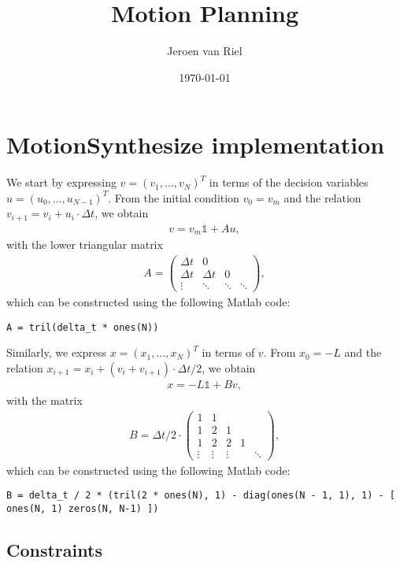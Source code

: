 \documentclass{article}
\author{Jeroen van Riel}
\date{\monthyeardate\today}
\title{Motion Planning}
\theoremstyle{definition}
\theoremstyle{plain}
\begin{document}
\section*{MotionSynthesize implementation}

We start by expressing $v = {(v_{1}, \dots, v_{N})}^{T}$ in terms of the decision variables $u = {(u_{0}, \dots, u_{N-1})}^{T}$.
From the initial condition $v_{0} = v_{m}$ and the relation $v_{i+1} = v_{i} + u_{i} \cdot \Delta t$, we obtain
\begin{align*}
  v = v_{m} \mathds{1} + Au ,
\end{align*}
with the lower triangular matrix
\begin{align*}
  A =
  \begin{pmatrix}
    \Delta t & 0  \\
    \Delta t & \Delta t & 0 &  \\
    \vdots & \ddots & \ddots & \ddots
    \end{pmatrix} ,
\end{align*}
which can be constructed using the following Matlab code:
\begin{lstlisting}[style=Matlab-editor]
  A = tril(delta_t * ones(N))
\end{lstlisting}

Similarly, we express $x = {(x_{1}, \dots, x_{N})}^{T}$ in terms of $v$.
From $x_{0} = -L$ and the relation $x_{i+1} = x_{i} + (v_{i} + v_{i+1}) \cdot \Delta t / 2$, we obtain
\begin{align*}
  x = -L \mathds{1} + Bv ,
\end{align*}
with the matrix
\begin{align*}
  B = \Delta t / 2 \cdot
  \begin{pmatrix}
    1 & 1 \\
    1 & 2 & 1 \\
    1 & 2 & 2 & 1 \\
    \vdots & \vdots & \vdots & \; & \ddots
  \end{pmatrix} ,
\end{align*}
which can be constructed using the following Matlab code:
\begin{lstlisting}[style=Matlab-editor]
  B = delta_t / 2 * (tril(2 * ones(N), 1) - diag(ones(N - 1, 1), 1) - [ ones(N, 1) zeros(N, N-1) ])
\end{lstlisting}

\subsection*{Constraints}
\end{document}
